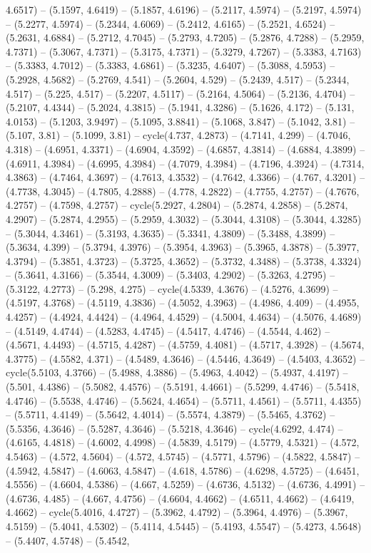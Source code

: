 4.6517) -- (5.1597, 4.6419) -- (5.1857, 4.6196) -- (5.2117, 4.5974) -- (5.2197, 4.5974) -- (5.2277, 4.5974) -- (5.2344, 4.6069) -- (5.2412, 4.6165) -- (5.2521, 4.6524) -- (5.2631, 4.6884) -- (5.2712, 4.7045) -- (5.2793, 4.7205) -- (5.2876, 4.7288) -- (5.2959, 4.7371) -- (5.3067, 4.7371) -- (5.3175, 4.7371) -- (5.3279, 4.7267) -- (5.3383, 4.7163) -- (5.3383, 4.7012) -- (5.3383, 4.6861) -- (5.3235, 4.6407) -- (5.3088, 4.5953) -- (5.2928, 4.5682) -- (5.2769, 4.541) -- (5.2604, 4.529) -- (5.2439, 4.517) -- (5.2344, 4.517) -- (5.225, 4.517) -- (5.2207, 4.5117) -- (5.2164, 4.5064) -- (5.2136, 4.4704) -- (5.2107, 4.4344) -- (5.2024, 4.3815) -- (5.1941, 4.3286) -- (5.1626, 4.172) -- (5.131, 4.0153) -- (5.1203, 3.9497) -- (5.1095, 3.8841) -- (5.1068, 3.847) -- (5.1042, 3.81) -- (5.107, 3.81) -- (5.1099, 3.81) -- cycle(4.737, 4.2873) -- (4.7141, 4.299) -- (4.7046, 4.318) -- (4.6951, 4.3371) -- (4.6904, 4.3592) -- (4.6857, 4.3814) -- (4.6884, 4.3899) -- (4.6911, 4.3984) -- (4.6995, 4.3984) -- (4.7079, 4.3984) -- (4.7196, 4.3924) -- (4.7314, 4.3863) -- (4.7464, 4.3697) -- (4.7613, 4.3532) -- (4.7642, 4.3366) -- (4.767, 4.3201) -- (4.7738, 4.3045) -- (4.7805, 4.2888) -- (4.778, 4.2822) -- (4.7755, 4.2757) -- (4.7676, 4.2757) -- (4.7598, 4.2757) -- cycle(5.2927, 4.2804) -- (5.2874, 4.2858) -- (5.2874, 4.2907) -- (5.2874, 4.2955) -- (5.2959, 4.3032) -- (5.3044, 4.3108) -- (5.3044, 4.3285) -- (5.3044, 4.3461) -- (5.3193, 4.3635) -- (5.3341, 4.3809) -- (5.3488, 4.3899) -- (5.3634, 4.399) -- (5.3794, 4.3976) -- (5.3954, 4.3963) -- (5.3965, 4.3878) -- (5.3977, 4.3794) -- (5.3851, 4.3723) -- (5.3725, 4.3652) -- (5.3732, 4.3488) -- (5.3738, 4.3324) -- (5.3641, 4.3166) -- (5.3544, 4.3009) -- (5.3403, 4.2902) -- (5.3263, 4.2795) -- (5.3122, 4.2773) -- (5.298, 4.275) -- cycle(4.5339, 4.3676) -- (4.5276, 4.3699) -- (4.5197, 4.3768) -- (4.5119, 4.3836) -- (4.5052, 4.3963) -- (4.4986, 4.409) -- (4.4955, 4.4257) -- (4.4924, 4.4424) -- (4.4964, 4.4529) -- (4.5004, 4.4634) -- (4.5076, 4.4689) -- (4.5149, 4.4744) -- (4.5283, 4.4745) -- (4.5417, 4.4746) -- (4.5544, 4.462) -- (4.5671, 4.4493) -- (4.5715, 4.4287) -- (4.5759, 4.4081) -- (4.5717, 4.3928) -- (4.5674, 4.3775) -- (4.5582, 4.371) -- (4.5489, 4.3646) -- (4.5446, 4.3649) -- (4.5403, 4.3652) -- cycle(5.5103, 4.3766) -- (5.4988, 4.3886) -- (5.4963, 4.4042) -- (5.4937, 4.4197) -- (5.501, 4.4386) -- (5.5082, 4.4576) -- (5.5191, 4.4661) -- (5.5299, 4.4746) -- (5.5418, 4.4746) -- (5.5538, 4.4746) -- (5.5624, 4.4654) -- (5.5711, 4.4561) -- (5.5711, 4.4355) -- (5.5711, 4.4149) -- (5.5642, 4.4014) -- (5.5574, 4.3879) -- (5.5465, 4.3762) -- (5.5356, 4.3646) -- (5.5287, 4.3646) -- (5.5218, 4.3646) -- cycle(4.6292, 4.474) -- (4.6165, 4.4818) -- (4.6002, 4.4998) -- (4.5839, 4.5179) -- (4.5779, 4.5321) -- (4.572, 4.5463) -- (4.572, 4.5604) -- (4.572, 4.5745) -- (4.5771, 4.5796) -- (4.5822, 4.5847) -- (4.5942, 4.5847) -- (4.6063, 4.5847) -- (4.618, 4.5786) -- (4.6298, 4.5725) -- (4.6451, 4.5556) -- (4.6604, 4.5386) -- (4.667, 4.5259) -- (4.6736, 4.5132) -- (4.6736, 4.4991) -- (4.6736, 4.485) -- (4.667, 4.4756) -- (4.6604, 4.4662) -- (4.6511, 4.4662) -- (4.6419, 4.4662) -- cycle(5.4016, 4.4727) -- (5.3962, 4.4792) -- (5.3964, 4.4976) -- (5.3967, 4.5159) -- (5.4041, 4.5302) -- (5.4114, 4.5445) -- (5.4193, 4.5547) -- (5.4273, 4.5648) -- (5.4407, 4.5748) -- (5.4542, 